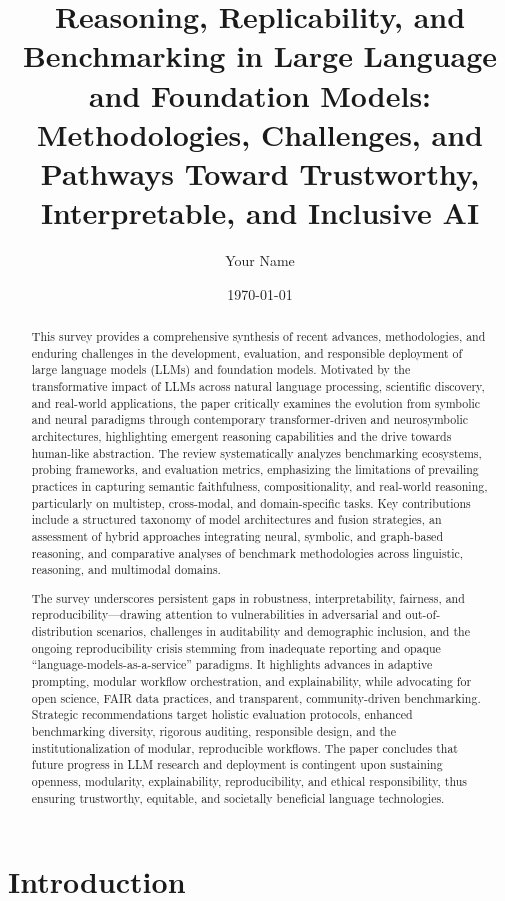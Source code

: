 \documentclass[11pt]{article}
\begin{document}
\author{Your Name}
\date{\today}

\title{\title{Reasoning, Replicability, and Benchmarking in Large Language and Foundation Models: Methodologies, Challenges, and Pathways Toward Trustworthy, Interpretable, and Inclusive AI}}
\maketitle

\begin{abstract}
This survey provides a comprehensive synthesis of recent advances, methodologies, and enduring challenges in the development, evaluation, and responsible deployment of large language models (LLMs) and foundation models. Motivated by the transformative impact of LLMs across natural language processing, scientific discovery, and real-world applications, the paper critically examines the evolution from symbolic and neural paradigms through contemporary transformer-driven and neurosymbolic architectures, highlighting emergent reasoning capabilities and the drive towards human-like abstraction. The review systematically analyzes benchmarking ecosystems, probing frameworks, and evaluation metrics, emphasizing the limitations of prevailing practices in capturing semantic faithfulness, compositionality, and real-world reasoning, particularly on multistep, cross-modal, and domain-specific tasks. Key contributions include a structured taxonomy of model architectures and fusion strategies, an assessment of hybrid approaches integrating neural, symbolic, and graph-based reasoning, and comparative analyses of benchmark methodologies across linguistic, reasoning, and multimodal domains.

The survey underscores persistent gaps in robustness, interpretability, fairness, and reproducibility—drawing attention to vulnerabilities in adversarial and out-of-distribution scenarios, challenges in auditability and demographic inclusion, and the ongoing reproducibility crisis stemming from inadequate reporting and opaque “language-models-as-a-service” paradigms. It highlights advances in adaptive prompting, modular workflow orchestration, and explainability, while advocating for open science, FAIR data practices, and transparent, community-driven benchmarking. Strategic recommendations target holistic evaluation protocols, enhanced benchmarking diversity, rigorous auditing, responsible design, and the institutionalization of modular, reproducible workflows. The paper concludes that future progress in LLM research and deployment is contingent upon sustaining openness, modularity, explainability, reproducibility, and ethical responsibility, thus ensuring trustworthy, equitable, and societally beneficial language technologies.
\end{abstract}\section{Introduction}
\end{document}
